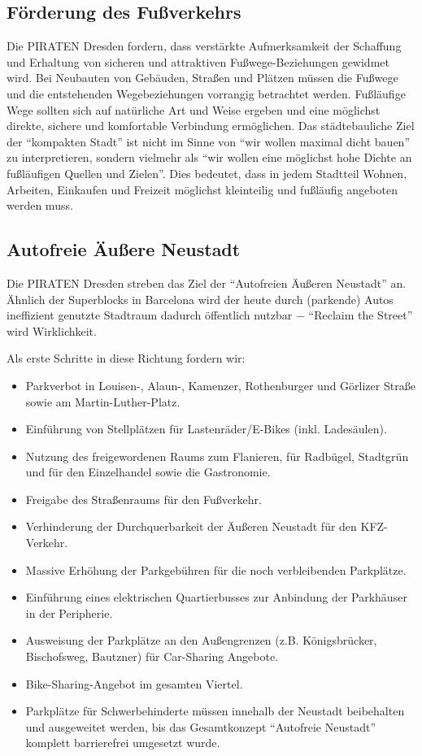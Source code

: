 \documentclass[a4paper, 11pt]{article}
\begin{document}
\subsection{Förderung des Fußverkehrs}
Die PIRATEN Dresden fordern, dass verstärkte Aufmerksamkeit der Schaffung und Erhaltung von sicheren und attraktiven Fußwege-Beziehungen gewidmet wird. Bei Neubauten von Gebäuden, Straßen und Plätzen müssen die Fußwege und die entstehenden Wegebeziehungen vorrangig betrachtet werden. Fußläufige Wege sollten sich auf natürliche Art und Weise ergeben und eine möglichst direkte, sichere und komfortable Verbindung ermöglichen. Das städtebauliche Ziel der ``kompakten Stadt'' ist nicht im Sinne von ``wir wollen maximal dicht bauen'' zu interpretieren, sondern vielmehr als ``wir wollen eine möglichst hohe Dichte an fußläufigen Quellen und Zielen''. Dies bedeutet, dass in jedem Stadtteil Wohnen, Arbeiten, Einkaufen und Freizeit möglichst kleinteilig und fußläufig angeboten werden muss.



\subsection{Autofreie Äußere Neustadt}
Die PIRATEN Dresden streben das Ziel der ``Autofreien Äußeren Neustadt'' an. Ähnlich der Superblocks in Barcelona wird der heute durch (parkende) Autos ineffizient genutzte Stadtraum dadurch öffentlich nutzbar $-$ ``Reclaim the Street'' wird Wirklichkeit.\newline

Als erste Schritte in diese Richtung fordern wir:

\begin{itemize}
    \item Parkverbot in Louisen-, Alaun-, Kamenzer, Rothenburger und Görlizer Straße sowie am Martin-Luther-Platz.
    \item  Einführung von Stellplätzen für Lastenräder/E-Bikes (inkl. Ladesäulen).
    \item  Nutzung des freigewordenen Raums zum Flanieren, für Radbügel, Stadtgrün und für den Einzelhandel sowie die Gastronomie.
    \item  Freigabe des Straßenraums für den Fußverkehr.
    \item  Verhinderung der Durchquerbarkeit der Äußeren Neustadt für den KFZ-Verkehr.
    \item  Massive Erhöhung der Parkgebühren für die noch verbleibenden Parkplätze.
    \item  Einführung eines elektrischen Quartierbusses zur Anbindung der Parkhäuser in der Peripherie.
    \item  Ausweisung der Parkplätze an den Außengrenzen (z.B. Königsbrücker, Bischofsweg, Bautzner) für Car-Sharing Angebote.
    \item Bike-Sharing-Angebot im gesamten Viertel.
    \item Parkplätze für Schwerbehinderte müssen innehalb der Neustadt beibehalten und ausgeweitet werden, bis das Gesamtkonzept ``Autofreie Neustadt'' komplett barrierefrei umgesetzt wurde.
\end{itemize}
\end{document}
